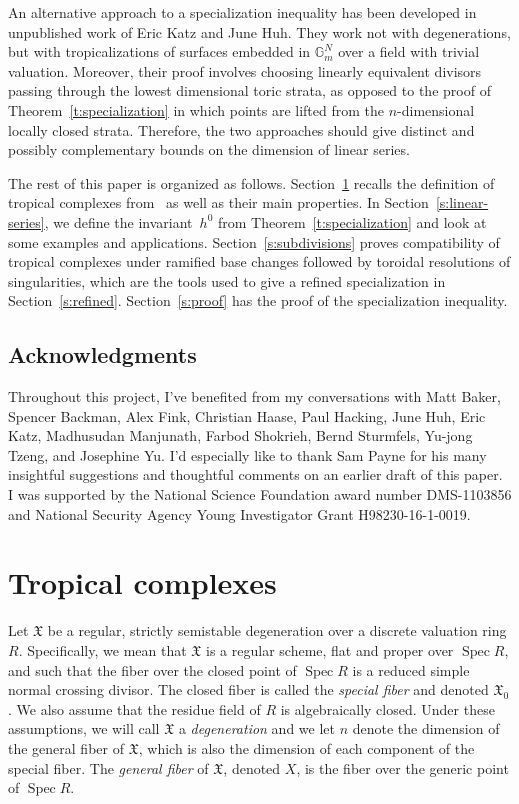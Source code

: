 \documentclass[11pt]{amsart}
\theoremstyle{definition}
\newcommand{\defi}[1]{\emph{#1}}
\newcommand{\Spec}{\operatorname{Spec}}
\newcommand{\X}{\mathfrak X}
\begin{document}
An alternative approach to a specialization inequality has been developed in
unpublished work of Eric Katz and June Huh. They work not with degenerations,
but with tropicalizations of surfaces embedded in $\mathbb G_m^N$ over a field
with trivial valuation. Moreover, their proof involves choosing linearly
equivalent divisors passing through the lowest dimensional toric strata, as
opposed to the proof of Theorem~\ref{t:specialization} in which points are
lifted from the $n$-dimensional locally closed strata. Therefore, the two
approaches should give distinct and possibly complementary bounds on the
dimension of linear series.

The rest of this paper is organized as follows.
Section~\ref{s:tropical-complexes} recalls the definition of tropical
complexes from~\cite{cartwright-complexes} as well as their main properties. In
Section~\ref{s:linear-series}, we define the invariant~$h^0$ from
Theorem~\ref{t:specialization} and look at some examples and applications.
Section~\ref{s:subdivisions} proves compatibility of tropical complexes under
ramified base changes followed by toroidal resolutions of singularities, which
are the tools used to give a refined specialization in
Section~\ref{s:refined}. Section~\ref{s:proof} has the proof of the
specialization inequality.

\subsection*{Acknowledgments}

Throughout this project, I've benefited from my conversations with Matt Baker,
Spencer Backman, Alex Fink, Christian Haase, Paul Hacking, June Huh, Eric Katz,
Madhusudan Manjunath, Farbod Shokrieh, Bernd Sturmfels, Yu-jong Tzeng, and
Josephine Yu. I'd especially like to thank Sam Payne for his many insightful
suggestions and thoughtful comments on an earlier draft of this paper. I was
supported by the National Science Foundation award number DMS-1103856 and
National Security Agency Young Investigator Grant H98230-16-1-0019.

\section{Tropical complexes}\label{s:tropical-complexes}

Let $\X$ be a regular, strictly semistable degeneration over a discrete
valuation ring $R$. Specifically, we mean that $\X$ is a regular scheme, flat
and proper over $\Spec R$, and such that the fiber over the closed point of
$\Spec R$
is a reduced simple normal crossing divisor. The closed fiber is called the
\defi{special fiber} and denoted $\X_0$. We
also assume that the residue field of $R$ is algebraically closed. Under these
assumptions, we will call $\X$ a \defi{degeneration} and we let $n$ denote the
dimension of the general fiber of $\X$, which is also the dimension of each
component of the special fiber. The \defi{general fiber} of $\X$, denoted $X$, is the
fiber over the generic point of $\Spec R$.
\end{document}

